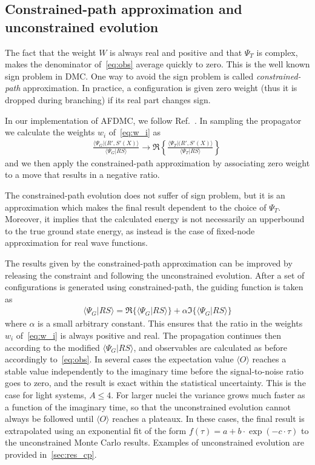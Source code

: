 \documentclass[aps,prc,twocolumn,superscriptaddress,floatfix]{revtex4-1}
\begin{document}
\subsection{Constrained-path approximation and unconstrained evolution}
\label{sec:cp}
The fact that the weight $W$ is always real and positive and that $\Psi_T$ is complex, 
makes the denominator of~\cref{eq:obs} average quickly to zero. 
This is the well known sign problem in DMC.
One way to avoid the sign problem is called \emph{constrained-path} approximation. In practice,
a configuration is given zero weight (thus it is dropped during branching) 
if its real part changes sign.

In our implementation of AFDMC, we follow Ref.~\cite{Zhang:2003}. 
In sampling the propagator we calculate the weights $w_i$ of~\cref{eq:w_i} as
\begin{align}
\frac{\langle\Psi_G|(R',S'(X)\rangle}{\langle\Psi_G|RS\rangle}\rightarrow
\Re\left\{\frac{\langle\Psi_T|(R',S'(X)\rangle}{\langle\Psi_T|RS\rangle}\right\}\,
\end{align}
and we then apply the constrained-path approximation by associating zero weight to a move
that results in a negative ratio.

The constrained-path evolution does not suffer of sign problem, but it is an approximation which makes the final result
dependent to the choice of $\Psi_T$. Moreover, it implies that the calculated energy is not necessarily
an upperbound to the true ground state energy, as instead is the case of fixed-node approximation 
for real wave functions.

The results given by the constrained-path approximation can be improved by releasing the 
constraint and following the unconstrained evolution.
After a set of configurations is generated using constrained-path, the guiding function
is taken as
\begin{align}
\langle\Psi_G|RS\rangle=\Re\big\{\langle\Psi_G|RS\rangle\big\}+\alpha\Im\big\{\langle\Psi_G|RS\rangle\big\}
\end{align}
where $\alpha$ is a small arbitrary constant.
This ensures that the ratio in the weights $w_i$ of~\cref{eq:w_i} is always positive and real.
The propagation continues then according to the modified $\langle\Psi_G|RS\rangle$, and 
observables are calculated as before accordingly to~\cref{eq:obs}.
In several cases the expectation value $\langle O\rangle$ reaches a stable value independently
to the imaginary time before the signal-to-noise ratio goes to zero, and the result is exact 
within the statistical uncertainty.
This is the case for light systems, $A\le4$. For larger nuclei the variance grows much faster 
as a function of the imaginary time, so that the unconstrained evolution cannot always be 
followed until $\langle O\rangle$ reaches a plateaux. In these cases, the final result is
extrapolated using an exponential fit of the form $f(\tau)=a+b\cdot\exp(-c\cdot\tau)$ to the unconstrained
Monte Carlo results. Examples of unconstrained evolution are provided in~\cref{sec:res_cp}.
\end{document}
